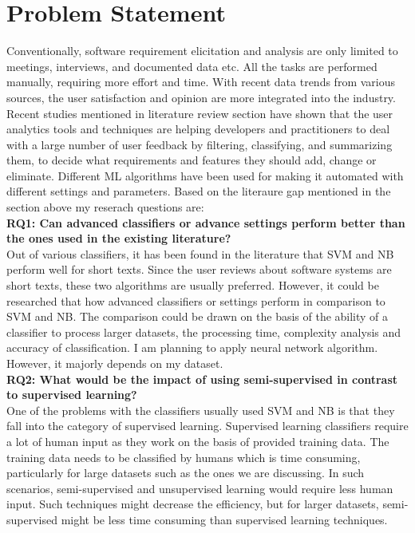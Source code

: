 \section{Problem Statement}
Conventionally, software requirement elicitation and analysis are only limited to meetings,
interviews, and documented data etc. All the tasks are performed manually, requiring more
effort and time. With recent data trends from various sources, the user satisfaction and opinion
are more integrated into the industry. Recent studies mentioned in literature review section have shown that the user analytics tools
and techniques are helping developers and practitioners to deal with a large number of user
feedback by filtering, classifying, and summarizing them, to decide what requirements and
features they should add, change or eliminate. Different ML algorithms have been used for
making it automated with different settings and parameters. Based on the literaure gap mentioned in the section above my reserach questions are:\\


\textbf{RQ1: Can advanced classifiers or advance settings perform better than the ones used in the existing
literature?}\\
Out of various classifiers, it has been found in the literature that SVM and NB perform well for
short texts. Since the user reviews about software systems are short texts, these two algorithms
are usually preferred. However, it could be researched that how advanced classifiers or settings perform
in comparison to SVM and NB. The comparison could be drawn on the basis of the ability of a
classifier to process larger datasets, the processing time, complexity analysis and accuracy of
classification. I am planning to apply neural network algorithm. However, it majorly depends on my dataset.\\

\textbf{RQ2: What would be the impact of using semi-supervised in
contrast to supervised learning?}\\
One of the problems with the classifiers usually used SVM and NB is that they fall into the
category of supervised learning. Supervised learning classifiers require a lot of human input as
they work on the basis of provided training data. The training data needs to be classified by
humans which is time consuming, particularly for large datasets such as the ones we are
discussing. In such scenarios, semi-supervised and unsupervised learning would require
less human input. Such techniques might decrease the efficiency, but for larger datasets, semi-supervised
might be less time consuming than supervised learning
techniques.\\

